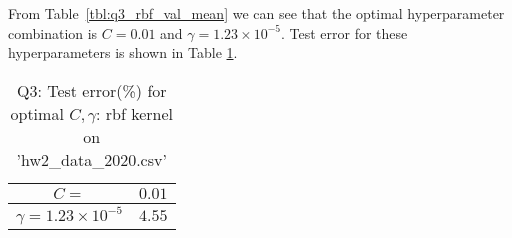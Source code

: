 From Table~\ref{tbl:q3_rbf_val_mean} we can see that the optimal hyperparameter combination is $C=0.01$ and $\gamma=1.23\times 10^{-5}$. Test error for these hyperparameters is shown in Table \ref{tbl:q3_rbf_test_error}.
\begin{table}[!ht]
	\centering
	\caption{Q3: Test error(\%) for optimal $C,\gamma$: rbf kernel on 'hw2\_data\_2020.csv'}
	\begin{tabular}[t]{cc} 
		\hline
		$C=$ & $0.01$ \\ [0.5ex] 
		\hline
		$\gamma=1.23\times 10^{-5}$ & $4.55$\\[1ex]
		\hline
	\end{tabular}
	\label{tbl:q3_rbf_test_error}
\end{table}